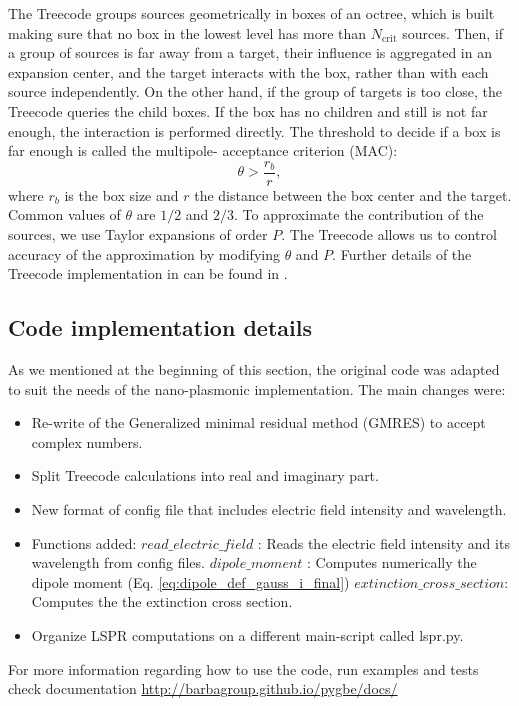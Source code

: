The Treecode groups sources geometrically in boxes of an octree, which is built making
sure that no box in the lowest level has more than $N_\text{crit}$ sources. Then, if a group of
sources is far away from a target, their influence is aggregated in an expansion center,
and the target interacts with the box, rather than with each source independently.
On the other hand, if the group of targets is too close, the Treecode queries the child
boxes. If the box has no children and still is not far enough, the interaction is 
performed directly. The threshold to decide if a box is far enough is called the multipole-
acceptance criterion (MAC):
%
\begin{equation}
\theta > \frac{r_b}{r},
\end{equation}
%
where $r_b$ is the box size and $r$ the distance between the box center and the target.
Common values of $\theta$ are $1/2$ and $2/3$.
To approximate the contribution of the sources, we use Taylor expansions
of order $P$.
The Treecode allows us to control accuracy of the approximation by modifying $\theta$ and $P$.
Further details of the Treecode implementation in \pygbe can be found in \cite{CooperBarba-share154331,CooperBardhanBarba2013}.

\subsection{Code implementation details} \label{sec:code_imp}

As we mentioned at the beginning of this section, the original \pygbe code was 
adapted to suit the needs of the nano-plasmonic implementation. The main changes
were:

\begin{itemize}
    \item Re-write of the Generalized minimal residual method (GMRES) to accept complex numbers. 
    \item Split Treecode calculations into real and imaginary part.
    \item New format of config file that includes electric field intensity and  wavelength.
    \item Functions added:
    \subitem $read\_electric\_field$ : Reads the electric field intensity and its wavelength from config files.
    \subitem $dipole\_moment$ : Computes numerically the dipole moment (Eq. \eqref{eq:dipole_def_gauss_i_final})
    \subitem $extinction\_cross\_section$: Computes the the extinction cross section.
    \item Organize LSPR computations on a different main-script called lspr.py.
\end{itemize}

For more information regarding how to use the code, run examples and tests check
\pygbe documentation \url{http://barbagroup.github.io/pygbe/docs/}

